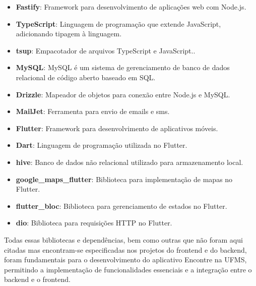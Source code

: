 \begin{itemize}
  \item \textbf{Fastify}: Framework para desenvolvimento de aplicações web com Node.js.
  \item \textbf{TypeScript}: Linguagem de programação que extende JavaScript, adicionando tipagem à linguagem.
  \item \textbf{tsup}: Empacotador de arquivos TypeScript e JavaScript..
  \item \textbf{MySQL}: MySQL é um sistema de gerenciamento de banco de dados relacional de código aberto baseado em SQL.
  \item \textbf{Drizzle}: Mapeador de objetos para conexão entre Node.js e MySQL.
  \item \textbf{MailJet}: Ferramenta para envio de emails e sms.
  \item \textbf{Flutter}: Framework para desenvolvimento de aplicativos móveis.
  \item \textbf{Dart}: Linguagem de programação utilizada no Flutter.
  \item \textbf{hive}: Banco de dados não relacional utilizado para armazenamento local.
  \item \textbf{google\_maps\_flutter}: Biblioteca para implementação de mapas no Flutter.
  \item \textbf{flutter\_bloc}: Biblioteca para gerenciamento de estados no Flutter.
  \item \textbf{dio}: Biblioteca para requisições HTTP no Flutter.
\end{itemize}

Todas essas bibliotecas e dependências, bem como outras que não foram aqui citadas mas encontram-se especificadas nos projetos do frontend e do backend, foram fundamentais para o desenvolvimento do aplicativo Encontre na UFMS, permitindo a implementação de funcionalidades essenciais e a integração entre o backend e o frontend.